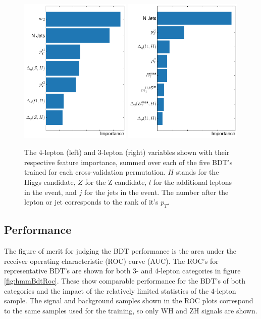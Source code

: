 \begin{figure}[htpb]
  \centering
  \includegraphics[height=7cm]{figures/hmm/bdtImportance/imp-4lep.pdf}
  \includegraphics[height=7cm]{figures/hmm/bdtImportance/imp-3lep.pdf}
  \caption{The 4-lepton (left) and 3-lepton (right) variables shown with their respective feature importance, summed over each of the five BDT's trained for each cross-validation permutation. $H$ stands for the Higgs candidate, $Z$ for the Z candidate, $l$ for the additional leptons in the event, and $j$ for the jets in the event. The number after the lepton or jet corresponds to the rank of it's $p_T$.}
    \label{fig:hmmVarImport}
\end{figure}

\clearpage

\subsection{Performance}
\label{sec:hmmBdtPerform}

The figure of merit for judging the BDT performance is the area under the receiver operating characteristic (ROC) curve (AUC). The ROC's for representative BDT's are shown for both 3- and 4-lepton categories in figure \ref{fig:hmmBdtRoc}. These show comparable performance for the BDT's of both categories and the impact of the relatively limited statistics of the 4-lepton sample. The signal and background samples shown in the ROC plots correspond to the same samples used for the training, so only WH and ZH signals are shown.

